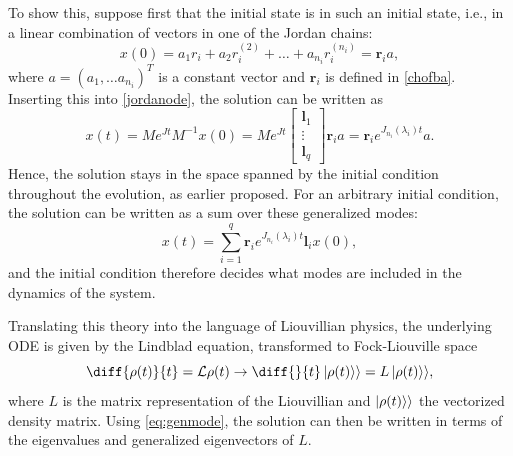 \documentclass[../main.tex]{subfiles}
\begin{document}
To show this, suppose first that the initial state is in such an initial state, i.e., in a linear combination of vectors in one of the Jordan chains:
\begin{equation}
    x(0) = a_1r_i + a_2r_i^{(2)} + \dots + a_{n_i}r_i^{(n_i)} = \boldsymbol{r}_ia,
\end{equation}
where $a = (a_1, \dots a_{n_i})^T$ is a constant vector and $\boldsymbol{r}_i$ is defined in \cref{chofba}. Inserting this into \cref{jordanode}, the solution can be written as
\begin{equation}
    x(t) = Me^{Jt}M^{-1}x(0) = Me^{Jt} \begin{bmatrix} \boldsymbol{l}_1 \\ \vdots \\ \boldsymbol{l}_{q} \end{bmatrix} \boldsymbol{r}_ia = \boldsymbol{r}_i e^{J_{n_i}(\lambda_i)t} a.
\end{equation}
Hence, the solution stays in the space spanned by the initial condition throughout the evolution, as earlier proposed. For an arbitrary initial condition, the solution can be written as a sum over these generalized modes: 
\begin{equation}\label{eq:genmode}
    x(t) = \sum_{i=1}^q \boldsymbol{r}_i e^{J_{n_i}(\lambda_i)t} \boldsymbol{l}_i x(0),
\end{equation}
and the initial condition therefore decides what modes are included in the dynamics of the system.

Translating this theory into the language of Liouvillian physics, the underlying ODE is given by the Lindblad equation, transformed to Fock-Liouville space    
\begin{equation}
    \diff{\rho(t)}{t}= \mathcal{L} \rho(t) \rightarrow \diff{}{t}\ket{\rho(t)}\rangle = L \ket{\rho(t)}\rangle,
\end{equation}
where $L$ is the matrix representation of the Liouvillian and $\ket{\rho(t)}\rangle$ the vectorized density matrix. Using \cref{eq:genmode}, the solution can then be written in terms of the eigenvalues and generalized eigenvectors of $L$.
\end{document}
